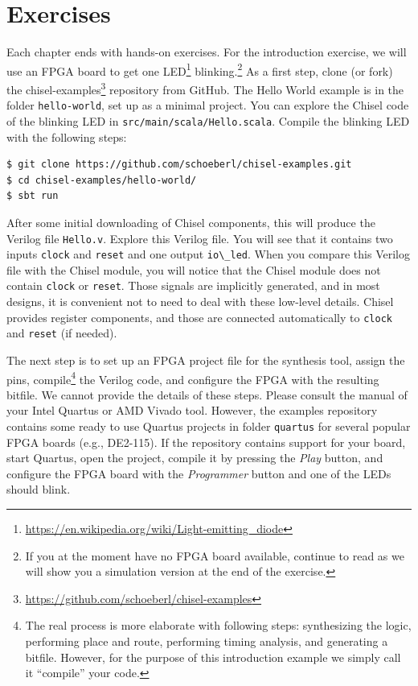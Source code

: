 \documentclass[%
    10pt,
    headinclude, footexclude,
    openright, %
    notitlepage,
    cleardoubleempty,
    headsepline,
    pointlessnumbers,
    bibtotoc, idxtotoc,
    ]{scrbook}
\newcommand{\code}[1]{{\lstinline[basicstyle=\small\ttfamily]{#1}}}
\newcommand{\myref}[2]{\href{#1}{#2}}
\renewcommand{\myref}[2]{{#2}{\footnote{\url{#1}}}}
\begin{document}
\section{Exercises}

Each chapter ends with hands-on exercises. For the introduction exercise, we will use an
FPGA board to get one \myref{https://en.wikipedia.org/wiki/Light-emitting_diode}{LED}
blinking.\footnote{If you at the moment have no FPGA board available, continue to read
as we will show you a simulation version at the end of the exercise.}
As a first step, clone (or fork) the \myref{https://github.com/schoeberl/chisel-examples}{chisel-examples}
repository from GitHub.
The Hello World example is in the folder \code{hello-world}, set up as
a minimal project. You can explore the Chisel code of the blinking LED
in \code{src/main/scala/Hello.scala}.
Compile the blinking LED with the following steps:

\begin{verbatim}
$ git clone https://github.com/schoeberl/chisel-examples.git
$ cd chisel-examples/hello-world/
$ sbt run
\end{verbatim}

After some initial downloading of Chisel components, this will produce the Verilog file \code{Hello.v}.
Explore this Verilog file. You will see that it contains two inputs \code{clock} and \code{reset}
and one output \code{io\_led}. When you compare this Verilog file with the Chisel module,
you will notice that the Chisel module does not contain \code{clock} or \code{reset}.
Those signals are implicitly generated, and in most designs, it is convenient not to need to
deal with these low-level details. Chisel provides register components, and those
are connected automatically to \code{clock} and \code{reset} (if needed).

The next step is to set up an FPGA project file for the synthesis tool, assign the pins,
compile\footnote{The real process is more elaborate with following steps: synthesizing the logic,
performing place and route, performing timing analysis, and generating a bitfile.
However, for the purpose of this introduction example we simply call it ``compile''
your code.} the Verilog code, and configure the FPGA with the resulting bitfile.
We cannot provide the details of these steps. Please consult the manual of
your Intel Quartus or AMD Vivado tool.
However, the examples repository contains some ready to use Quartus
projects in folder \code{quartus} for several popular FPGA boards (e.g., DE2-115).
If the repository contains support for your board, start Quartus, open the project,
compile it by pressing the \emph{Play} button, and configure the FPGA board
with the \emph{Programmer} button and one of the LEDs should blink.
\end{document}
